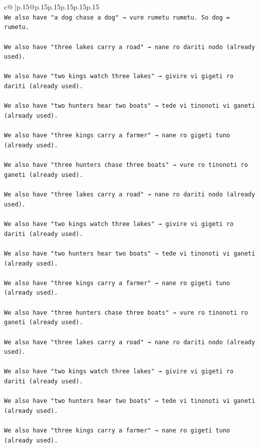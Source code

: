 \documentclass{article}
\begin{document}
{\begin{supertabular}{c@{$\;$}|p{.15\linewidth}@{}p{.15\linewidth}p{.15\linewidth}p{.15\linewidth}p{.15\linewidth}p{.15\linewidth}}
{{{\\ 
\texttt{We also have "a dog chase a dog" → vure rumetu rumetu. So dog = rumetu.} \\
\\ 
\texttt{We also have "three lakes carry a road" → nane ro dariti nodo (already used).} \\
\\ 
\texttt{We also have "two kings watch three lakes" → givire vi gigeti ro dariti (already used).} \\
\\ 
\texttt{We also have "two hunters hear two boats" → tede vi tinonoti vi ganeti (already used).} \\
\\ 
\texttt{We also have "three kings carry a farmer" → nane ro gigeti tuno (already used).} \\
\\ 
\texttt{We also have "three hunters chase three boats" → vure ro tinonoti ro ganeti (already used).} \\
\\ 
\texttt{We also have "three lakes carry a road" → nane ro dariti nodo (already used).} \\
\\ 
\texttt{We also have "two kings watch three lakes" → givire vi gigeti ro dariti (already used).} \\
\\ 
\texttt{We also have "two hunters hear two boats" → tede vi tinonoti vi ganeti (already used).} \\
\\ 
\texttt{We also have "three kings carry a farmer" → nane ro gigeti tuno (already used).} \\
\\ 
\texttt{We also have "three hunters chase three boats" → vure ro tinonoti ro ganeti (already used).} \\
\\ 
\texttt{We also have "three lakes carry a road" → nane ro dariti nodo (already used).} \\
\\ 
\texttt{We also have "two kings watch three lakes" → givire vi gigeti ro dariti (already used).} \\
\\ 
\texttt{We also have "two hunters hear two boats" → tede vi tinonoti vi ganeti (already used).} \\
\\ 
\texttt{We also have "three kings carry a farmer" → nane ro gigeti tuno (already used).} \\
}}}
\end{supertabular}}
\end{document}
